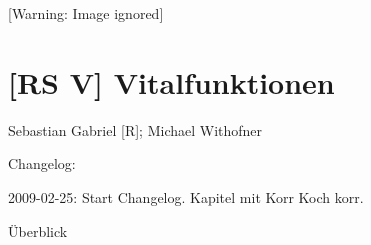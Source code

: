 \documentclass{article}
\makeatletter
\newcommand\captionof[1]{\def\@captype{#1}\caption}
\makeatother
\begin{document}
 [Warning: Image ignored] %
\captionof{figure}[Der weibliche Zyklus. Oben: Follikelreifung. Unten:
Auf- und Abbau der Uterusschleimhaut. Am Tag 0 des Zyklus wird die
Uterusschleimheut abgestossen, es kommt zur Regelblutung, danach wird
die Schleimhaut wieder aufgebaut. Am Tag 14 erfolgt der Eispung. Kommt
es zu keiner Befruchtung wird die Schleimheut erneut am Tag 28
abgesto{\ss}en. Nach einer Befruchtung wandert die Eizelle weiter in
den Uterus und nistet sich dort ein. ]{Der weibliche Zyklus. Oben:
Follikelreifung. Unten: Auf- und Abbau der Uterusschleimhaut. Am Tag 0
des Zyklus wird die Uterusschleimheut abgestossen, es kommt zur
Regelblutung, danach wird die Schleimhaut wieder aufgebaut. Am Tag 14
erfolgt der Eispung. Kommt es zu keiner Befruchtung wird die
Schleimheut erneut am Tag 28 abgesto{\ss}en. Nach einer Befruchtung
wandert die Eizelle weiter in den Uterus und nistet sich dort ein. }


\section{[RS V] Vitalfunktionen}
Sebastian Gabriel [R]; Michael Withofner

Changelog:

2009-02-25: Start Changelog. Kapitel mit Korr Koch korr.

\"Uberblick
\end{document}
